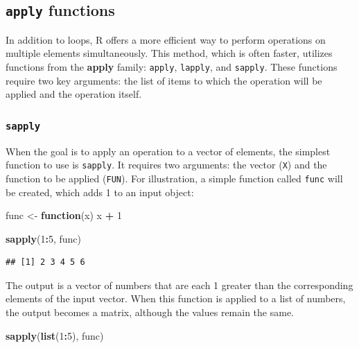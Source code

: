 \documentclass[
]{article}
\newenvironment{Shaded}{\begin{snugshade}}{\end{snugshade}}
\newcommand{\ControlFlowTok}[1]{\textcolor[rgb]{0.13,0.29,0.53}{\textbf{#1}}}
\newcommand{\DecValTok}[1]{\textcolor[rgb]{0.00,0.00,0.81}{#1}}
\newcommand{\FunctionTok}[1]{\textcolor[rgb]{0.13,0.29,0.53}{\textbf{#1}}}
\newcommand{\NormalTok}[1]{#1}
\newcommand{\OtherTok}[1]{\textcolor[rgb]{0.56,0.35,0.01}{#1}}
\newcommand{\SpecialCharTok}[1]{\textcolor[rgb]{0.81,0.36,0.00}{\textbf{#1}}}
\begin{document}
\subsection{\texorpdfstring{\texttt{apply} functions}{apply functions}}\label{apply-functions}

In addition to loops, R offers a more efficient way to perform operations on multiple elements simultaneously. This method, which is often faster, utilizes functions from the \textbf{apply} family: \texttt{apply}, \texttt{lapply}, and \texttt{sapply}. These functions require two key arguments: the list of items to which the operation will be applied and the operation itself.

\subsubsection{\texorpdfstring{\texttt{sapply}}{sapply}}\label{sapply}

When the goal is to apply an operation to a vector of elements, the simplest function to use is \texttt{sapply}. It requires two arguments: the vector (\texttt{X}) and the function to be applied (\texttt{FUN}). For illustration, a simple function called \texttt{func} will be created, which adds 1 to an input object:

\begin{Shaded}
\begin{Highlighting}[]
\NormalTok{func }\OtherTok{\textless{}{-}} \ControlFlowTok{function}\NormalTok{(x)}
\NormalTok{  x }\SpecialCharTok{+} \DecValTok{1}

\FunctionTok{sapply}\NormalTok{(}\DecValTok{1}\SpecialCharTok{:}\DecValTok{5}\NormalTok{, func)}
\end{Highlighting}
\end{Shaded}

\begin{verbatim}
## [1] 2 3 4 5 6
\end{verbatim}

The output is a vector of numbers that are each 1 greater than the corresponding elements of the input vector. When this function is applied to a list of numbers, the output becomes a matrix, although the values remain the same.

\begin{Shaded}
\begin{Highlighting}[]
\FunctionTok{sapply}\NormalTok{(}\FunctionTok{list}\NormalTok{(}\DecValTok{1}\SpecialCharTok{:}\DecValTok{5}\NormalTok{), func)}
\end{Highlighting}
\end{Shaded}
\end{document}
